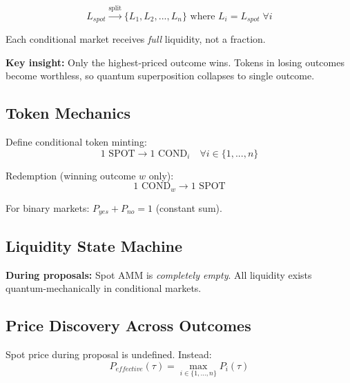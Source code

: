 \documentclass{article}
\begin{document}
$$L_{spot} \xrightarrow{\text{split}} \{L_1, L_2, ..., L_n\} \text{ where } L_i = L_{spot} \; \forall i$$

Each conditional market receives \emph{full} liquidity, not a fraction.

\textbf{Key insight:} Only the highest-priced outcome wins. Tokens in losing outcomes become worthless, so quantum superposition collapses to single outcome.

\subsection{Token Mechanics}

Define conditional token minting:
$$1 \text{ SPOT} \to 1 \text{ COND}_i \quad \forall i \in \{1,...,n\}$$

Redemption (winning outcome $w$ only):
$$1 \text{ COND}_w \to 1 \text{ SPOT}$$

For binary markets: $P_{yes} + P_{no} = 1$ (constant sum).

\subsection{Liquidity State Machine}

\begin{center}
\end{center}

\textbf{During proposals:} Spot AMM is \emph{completely empty}. All liquidity exists quantum-mechanically in conditional markets.

\subsection{Price Discovery Across Outcomes}

Spot price during proposal is undefined. Instead:
$$P_{effective}(\tau) = \max_{i \in \{1,...,n\}} P_i(\tau)$$
\end{document}
